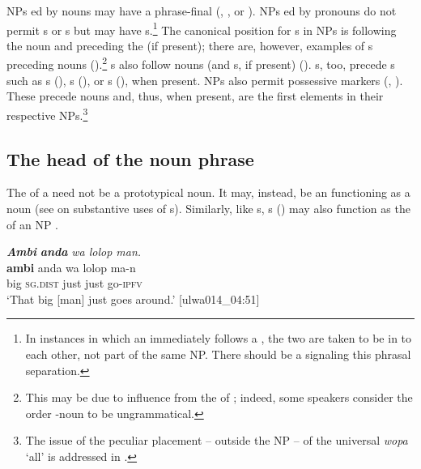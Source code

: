 NPs ed by nouns may have a phrase-final  (, , or  ). NPs ed by pronouns do not permit s or s but may have s.\footnote{In instances in which an  immediately follows a , the two are taken to be in  to each other, not part of the same NP. There should be a  signaling this phrasal separation.} The canonical position for s in NPs is following the noun and preceding the  (if present); there are, however, examples of s preceding nouns ().\footnote{This may be due to influence from the  of ; indeed, some speakers consider the order -noun to be ungrammatical.} s also follow nouns (and s, if present) (). s, too, precede s such as s (), s (), or s (), when present. NPs also permit  possessive markers (, ). These precede nouns and, thus, when present, are the first elements in their respective NPs.\footnote{The issue of the peculiar placement -- outside the NP -- of the universal  \textit{wopa} ‘all’ is addressed in .}


\subsection{The head of the noun phrase}\label{sec:9.1.1}


The  of a  need not be a prototypical noun. It may, instead, be an  functioning as a noun  (see  on substantive uses of s). Similarly, like s, s () may also function as the  of an NP .

\ea%
    \label{ex:phrase:3}
            \textbf{\textit{Ambi}} \textbf{\textit{anda}} \textit{wa lolop man.}\\
\gll    \textbf{ambi}  anda    wa  lolop  ma-n\\
    big    \textsc{sg.dist}  just  just    go-\textsc{ipfv}\\
\glt `That big [man] just goes around.’ [ulwa014\_04:51]
\z


